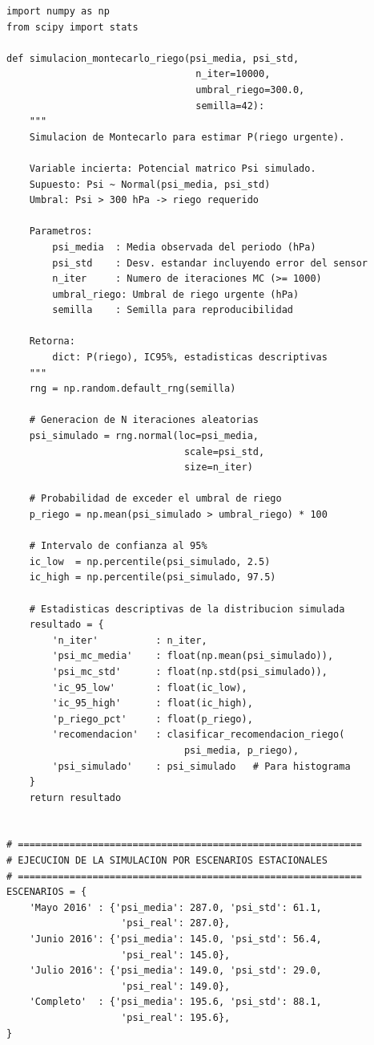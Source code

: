 \documentclass[12pt,a4paper]{article}
\begin{document}
\begin{lstlisting}[caption={Simulación de Montecarlo con 10\,000 iteraciones por escenario estacional.}, label=lst:montecarlo]
import numpy as np
from scipy import stats

def simulacion_montecarlo_riego(psi_media, psi_std, 
                                 n_iter=10000, 
                                 umbral_riego=300.0,
                                 semilla=42):
    """
    Simulacion de Montecarlo para estimar P(riego urgente).
    
    Variable incierta: Potencial matrico Psi simulado.
    Supuesto: Psi ~ Normal(psi_media, psi_std)
    Umbral: Psi > 300 hPa -> riego requerido
    
    Parametros:
        psi_media  : Media observada del periodo (hPa)
        psi_std    : Desv. estandar incluyendo error del sensor
        n_iter     : Numero de iteraciones MC (>= 1000)
        umbral_riego: Umbral de riego urgente (hPa)
        semilla    : Semilla para reproducibilidad
    
    Retorna:
        dict: P(riego), IC95%, estadisticas descriptivas
    """
    rng = np.random.default_rng(semilla)
    
    # Generacion de N iteraciones aleatorias
    psi_simulado = rng.normal(loc=psi_media, 
                               scale=psi_std, 
                               size=n_iter)
    
    # Probabilidad de exceder el umbral de riego
    p_riego = np.mean(psi_simulado > umbral_riego) * 100
    
    # Intervalo de confianza al 95%
    ic_low  = np.percentile(psi_simulado, 2.5)
    ic_high = np.percentile(psi_simulado, 97.5)
    
    # Estadisticas descriptivas de la distribucion simulada
    resultado = {
        'n_iter'          : n_iter,
        'psi_mc_media'    : float(np.mean(psi_simulado)),
        'psi_mc_std'      : float(np.std(psi_simulado)),
        'ic_95_low'       : float(ic_low),
        'ic_95_high'      : float(ic_high),
        'p_riego_pct'     : float(p_riego),
        'recomendacion'   : clasificar_recomendacion_riego(
                               psi_media, p_riego),
        'psi_simulado'    : psi_simulado   # Para histograma
    }
    return resultado


# ============================================================
# EJECUCION DE LA SIMULACION POR ESCENARIOS ESTACIONALES
# ============================================================
ESCENARIOS = {
    'Mayo 2016' : {'psi_media': 287.0, 'psi_std': 61.1,
                    'psi_real': 287.0},
    'Junio 2016': {'psi_media': 145.0, 'psi_std': 56.4,
                    'psi_real': 145.0},
    'Julio 2016': {'psi_media': 149.0, 'psi_std': 29.0,
                    'psi_real': 149.0},
    'Completo'  : {'psi_media': 195.6, 'psi_std': 88.1,
                    'psi_real': 195.6},
}


\end{lstlisting}
\end{document}
